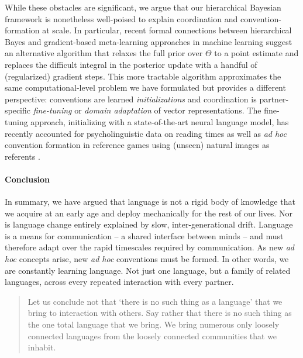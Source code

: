 While these obstacles are significant, we argue that our hierarchical Bayesian framework is nonetheless well-poised to explain coordination and convention-formation at scale. 
In particular, recent formal connections between hierarchical Bayes and gradient-based meta-learning approaches in machine learning \cite{grant_recasting_2018} suggest an alternative algorithm that relaxes the full prior over $\Theta$ to a point estimate and replaces the difficult integral in the posterior update with a handful of (regularized) gradient steps. 
This more tractable algorithm approximates the same computational-level problem we have formulated but provides a different perspective: conventions are learned \emph{initializations} and coordination is partner-specific \emph{fine-tuning} or \emph{domain adaptation} of vector representations. 
The fine-tuning approach, initializing with a state-of-the-art neural language model, has recently accounted for psycholinguistic data on reading times \cite{van2018neural} as well as \emph{ad hoc} convention formation in reference games using (unseen) natural images as referents \cite{hawkins2019continual}.

%


\paragraph{Conclusion}

In summary, we have argued that language is not a rigid body of knowledge that we acquire at an early age and deploy mechanically for the rest of our lives. 
Nor is language change entirely explained by slow, inter-generational drift.
Language is a means for communication -- a shared interface between minds -- and must therefore adapt over the rapid timescales required by communication.
As new \emph{ad hoc} concepts arise, new \emph{ad hoc} conventions must be formed.
In other words, we are constantly learning language. 
Not just one language, but a family of related languages, across every repeated interaction with every partner. 

\begin{quote}
Let us conclude not that ‘there is no such thing as a language’ that we bring to interaction with others. Say rather that there is no such thing as the one total language that we bring. We bring numerous only loosely connected languages from the loosely connected communities that we inhabit. \cite{hacking1986nice}
\end{quote}
